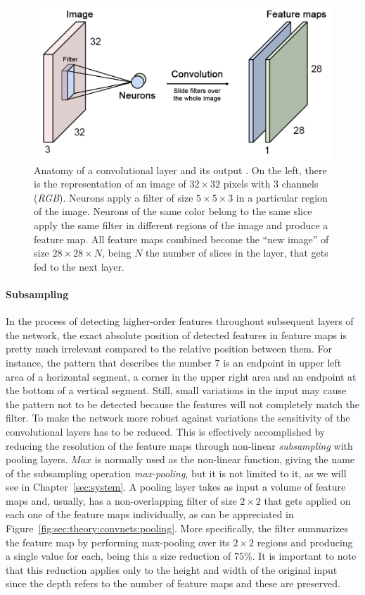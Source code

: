 \begin{figure}[htb]
  \includegraphics[width=\textwidth]{gfx/conv-layer-2}
  \caption{
    Anatomy of a convolutional layer and its output \cite{Guerzhoy2016}.
    On the left, there is the representation of an image of ${32}\times{32}$ pixels with $3$ channels (\emph{RGB}).
    Neurons apply a filter of size ${5}\times{5}\times{3}$ in a particular region of the image.
    Neurons of the same color belong to the same slice apply the same filter in different regions of the image and produce a feature map.
    All feature maps combined become the ``new image'' of size ${28}\times{28}\times{N}$, being $N$ the number of slices in the layer, that gets fed to the next layer.
  }
  \label{fig:sec:theory:conv-layer-2}
\end{figure}

\paragraph{Subsampling}
In the process of detecting higher-order features throughout subsequent layers of the network, the exact absolute position of detected features in feature maps is pretty much irrelevant compared to the relative position between them.
For instance, the pattern that describes the number $7$ is an endpoint in upper left area of a horizontal segment, a corner in the upper right area and an endpoint at the bottom of a vertical segment.
Still, small variations in the input may cause the pattern not to be detected because the features will not completely match the filter.
To make the network more robust against variations the sensitivity of the convolutional layers has to be reduced.
This is effectively accomplished by reducing the resolution of the feature maps through non-linear \emph{subsampling} with pooling layers.
$Max$ is normally used as the non-linear function, giving the name of the subsampling operation \emph{max-pooling}, but it is not limited to it, as we will see in Chapter~\ref{sec:system}.
A pooling layer takes as input a volume of feature maps and, usually, has a non-overlapping filter of size ${2}\times{2}$ that gets applied on each one of the feature maps individually, as can be appreciated in Figure~\ref{fig:sec:theory:convnets:pooling}.
More specifically, the filter summarizes the feature map by performing max-pooling over its ${2}\times{2}$ regions and producing a single value for each, being this a size reduction of $75\%$.
It is important to note that this reduction applies only to the height and width of the original input since the depth refers to the number of feature maps and these are preserved.

